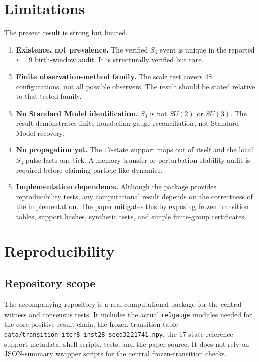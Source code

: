 \documentclass[11pt]{article}
\begin{document}
\section{Limitations}

The present result is strong but limited.

\begin{enumerate}
\item \textbf{Existence, not prevalence.}  The verified $S_3$ event is unique in the reported $v=9$ birth-window audit.  It is structurally verified but rare.
\item \textbf{Finite observation-method family.}  The scale test covers $48$ configurations, not all possible observers.  The result should be stated relative to that tested family.
\item \textbf{No Standard Model identification.}  $S_3$ is not $SU(2)$ or $SU(3)$.  The result demonstrates finite nonabelian gauge reconciliation, not Standard Model recovery.
\item \textbf{No propagation yet.}  The $17$-state support maps out of itself and the local $S_3$ pulse lasts one tick.  A memory-transfer or perturbation-stability audit is required before claiming particle-like dynamics.
\item \textbf{Implementation dependence.}  Although the package provides reproducibility tests, any computational result depends on the correctness of the implementation.  The paper mitigates this by exposing frozen transition tables, support hashes, synthetic tests, and simple finite-group certificates.
\end{enumerate}

\section{Reproducibility}

\subsection*{Repository scope}
The accompanying repository is a real computational package for the central witness and consensus tests.  It includes the actual \texttt{relgauge} modules needed for the core positive-result chain, the frozen transition table \texttt{data/transition\_iter8\_inst28\_seed3221741.npy}, the 17-state reference support metadata, shell scripts, tests, and the paper source.  It does not rely on JSON-summary wrapper scripts for the central frozen-transition checks.
\end{document}
